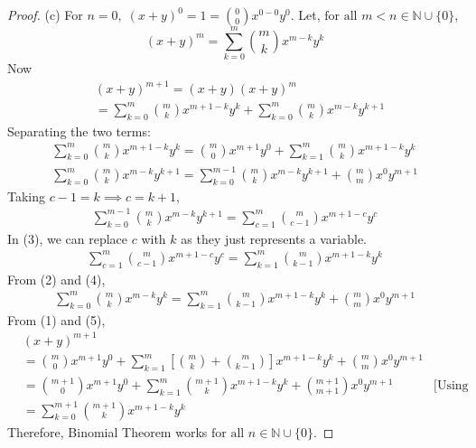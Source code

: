 \documentclass[12pt]{article}
\begin{document}
\begin{proof}
	(c) For $n = 0, \; (x + y)^0 = 1 = \binom{0}{0}x^{0-0}y^0$. Let, $\text{for all } m < n \in {\mathbb{N}} \cup \{0\}$,
	\[
		(x + y)^m = \sum_{k=0}^{m} \binom{m}{k} x^{m-k} y^k
	\]
	Now
	\begin{align*}
		 & (x + y)^{m+1} = (x+y)(x+y)^m                                                         \\
		 & = \sum_{k=0}^m \binom{m}{k}x^{m+1-k}y^{k} + \sum_{k=0}^m \binom{m}{k} x^{m-k}y^{k+1}
	\end{align*}
	Separating the two terms:
	\begin{align}
		\sum_{k=0}^m \binom{m}{k} x^{m+1-k} y^k = \binom{m}{0} x^{m+1} y^0 + \sum_{k=1}^m \binom{m}{k} x^{m+1-k} y^k \\
		\sum_{k=0}^m \binom{m}{k} x^{m-k} y^{k+1} = \sum_{k=0}^{m-1} \binom{m}{k} x^{m-k} y^{k+1} + \binom{m}{m} x^0 y^{m+1}
	\end{align}
	Taking $c-1 = k \implies c = k+1$,
	\begin{align}
		\sum_{k=0}^{m-1} \binom{m}{k} x^{m-k} y^{k+1} = \sum_{c=1}^m \binom{m}{c-1} x^{m+1-c} y^c
	\end{align}
	In (3), we can replace $c$ with $k$ as they just represents a variable.
	\begin{align}
		\sum_{c=1}^m \binom{m}{c-1} x^{m+1-c} y^c = \sum_{k=1}^m \binom{m}{k-1} x^{m+1-k} y^k
	\end{align}
	From (2) and (4),
	\begin{align}
		\sum_{k=0}^m \binom{m}{k} x^{m-k} y^{k} = \sum_{k=1}^m \binom{m}{k-1} x^{m+1-k} y^{k} + \binom{m}{m} x^0 y^{m+1}
	\end{align}
	From (1) and (5),
	\begin{align*}
		 & (x + y)^{m+1}                                                                                                                                                     \\
		 & = \binom{m}{0} x^{m+1} y^0 + \sum_{k=1}^m \left[ \binom{m}{k} + \binom{m}{k-1} \right]x^{m+1-k} y^k + \binom{m}{m} x^0 y^{m+1}                                    \\
		 & = \binom{m+1}{0} x^{m+1} y^0 + \sum_{k=1}^m \binom{m+1}{k} x^{m+1-k} y^k + \binom{m+1}{m+1} x^0 y^{m+1}                        & \text{[Using (a) and parts (b)]} \\
		 & = \sum_{k=0}^{m+1} \binom{m+1}{k} x^{m+1-k} y^k
	\end{align*}
	Therefore, Binomial Theorem works $\text{for all } n \in {\mathbb{N}}\cup \{0\}$.

\end{proof}
\end{document}
